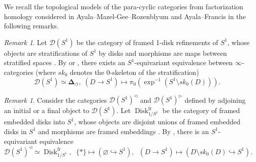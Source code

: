 \documentclass[11pt]{amsart}
\numberwithin{equation}{section}
\theoremstyle{plain}
\theoremstyle{definition}
\theoremstyle{remark}
\newtheorem{RMK}[rmk]{Remark}
\newcommand{\cD} { {\mathcal{D}}}
\begin{document}
    We recall the topological models of the para-cyclic categories from factorization homology considered in Ayala--Mazel-Gee--Rozenblyum \cite{AMGR-FH-enriched} and Ayala--Francis \cite{Ayala-Francis-FH-dim1} in the following remarks.

\begin{RMK}\label{rem:cyclic-combin-topol}
    Let $\cD(S^1)$ be the category of framed 1-disk refinements of $S^1$, whose objects are stratifications of $S^1$ by disks and morphisms are maps between stratified spaces \cite[Definition 1.18]{AMGR-FH-enriched}. By \cite[Observation 1.20]{AMGR-FH-enriched} or \cite[Observation 1.3 \& Corollary B.9]{Ayala-Francis-FH-dim1}, there exists an $S^1$-equivariant equivalence between $\infty$-categories (where $sk_0$ denotes the 0-skeleton of the stratification)
    \[\cD(S^1) \simeq \boldsymbol{\Delta}_\circlearrowleft, \; (D \to S^1) \mapsto \pi_0(\exp^{-1}(S^1 \setminus sk_0(D))).\]
\end{RMK}
\begin{RMK}\label{rem:disk-stratum-embed}
    Consider the categories $\cD(S^1)^{\triangleleft}$ and $\cD(S^1)^{\triangleright}$ defined by adjoining an initial or a final object to $\cD(S^1)$. Let $\operatorname{Disk}_{1/S^1}^\text{fr}$ be the category of framed embedded disks into $S^1$, whose objects are disjoint unions of framed embedded disks in $S^1$ and morphisms are framed embeddings \cite[Section 2.2]{Ayala-Francis-FH}. By \cite[Corollary B.9]{Ayala-Francis-FH-dim1}, there is an $S^1$-equivariant equivalence
    \[\cD(S^1)^\triangleleft \simeq \operatorname{Disk}_{1/S^1}^\text{fr}, \;\; \{*\} \mapsto (\varnothing \hookrightarrow S^1),\;\; (D \to S^1) \mapsto (D \setminus sk_0(D) \hookrightarrow S^1).\]
\end{RMK}
\end{document}
